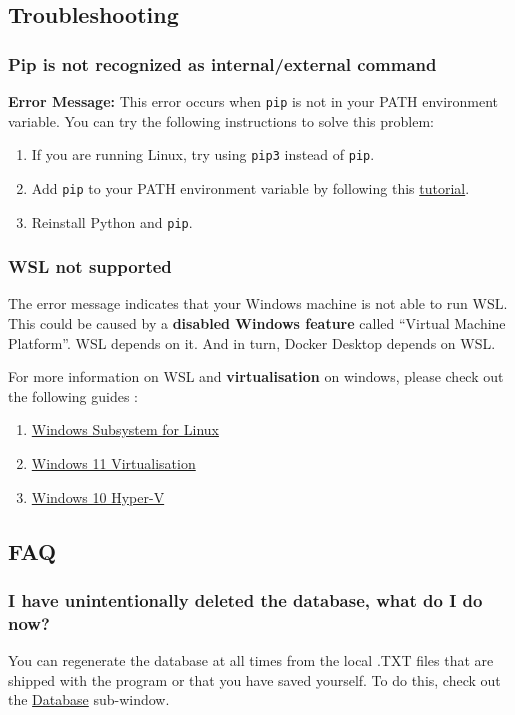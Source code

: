 \subsection{Troubleshooting}
\subsubsection{Pip is not recognized as internal/external command}
\textbf{Error Message:} This error occurs when \texttt{pip} is not in your PATH environment variable. You can try the following instructions to solve this problem:
\begin{enumerate}
    \item If you are running Linux, try using \texttt{pip3} instead of \texttt{pip}.
    \item Add \texttt{pip} to your PATH environment variable by following this \href{https://www.geeksforgeeks.org/how-to-install-  pip-on-windows/}{tutorial}.
    \item Reinstall Python and \texttt{pip}.
\end{enumerate}
\subsubsection{WSL not supported}
The error message indicates that your Windows machine is not able to run WSL. This could be caused by a \textbf{disabled Windows feature} called “Virtual Machine Platform”. WSL depends on it. And in turn, Docker Desktop depends on WSL.

For more information on WSL and \textbf{virtualisation} on windows, please check out the following guides : 

\begin{enumerate}
    \item \href{https://learn.microsoft.com/en-us/windows/wsl/troubleshooting}{Windows Subsystem for Linux}
    \item \href{https://support.microsoft.com/en-us/windows/enable-virtualization-on-windows-11-pcs-c5578302-6e43-4b4b-a449-8ced115f58e1}{Windows 11 Virtualisation}
    \item \href{https://learn.microsoft.com/en-us/virtualization/hyper-v-on-windows/quick-start/enable-hyper-v}{Windows 10 Hyper-V}
\end{enumerate}
\clearpage
\subsection{FAQ}
\subsubsection{I have unintentionally deleted the database, what do I do now?}
You can regenerate the database at all times from the local .TXT files that are shipped with the program or that you have saved yourself. To do this, check out the \hyperref[subsubsec:database]{Database} sub-window.

